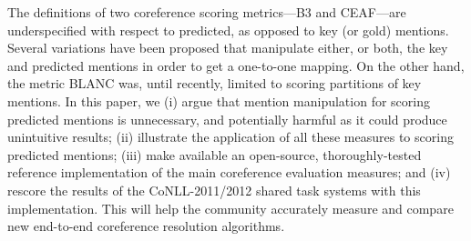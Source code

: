 The definitions of two coreference scoring metrics---B3 and CEAF---are underspecified with respect to predicted, as opposed to key (or gold) mentions. Several variations have been proposed that manipulate either, or both, the key and predicted mentions in order to get a one-to-one mapping. On the other hand, the metric BLANC was, until recently, limited to scoring partitions of key mentions. In this paper, we (i) argue that mention manipulation for scoring predicted mentions is unnecessary, and potentially harmful as it could produce unintuitive results; (ii) illustrate the application of all these measures to scoring predicted mentions; (iii) make available an open-source, thoroughly-tested reference implementation of the main coreference evaluation measures; and (iv) rescore the results of the CoNLL-2011/2012 shared task systems with this implementation. This will help the community accurately measure and compare new end-to-end coreference resolution algorithms.

